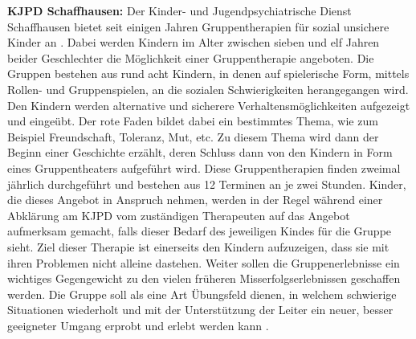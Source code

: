 \textbf{KJPD Schaffhausen:}
Der Kinder- und Jugendpsychiatrische Dienst Schaffhausen bietet seit einigen Jahren Gruppentherapien für sozial unsichere Kinder an \cite{KJPDW:2016}. Dabei werden Kindern im Alter zwischen sieben und elf Jahren beider Geschlechter die Möglichkeit einer Gruppentherapie angeboten. Die Gruppen bestehen aus rund acht Kindern, in denen auf spielerische Form, mittels Rollen- und Gruppenspielen, an die sozialen Schwierigkeiten herangegangen wird. Den Kindern werden alternative und sicherere Verhaltensmöglichkeiten aufgezeigt und eingeübt. Der rote Faden bildet dabei ein bestimmtes Thema, wie zum Beispiel Freundschaft, Toleranz, Mut, etc. Zu diesem Thema wird dann der Beginn einer Geschichte erzählt, deren Schluss dann von den Kindern in Form eines Gruppentheaters aufgeführt wird. Diese Gruppentherapien finden zweimal jährlich durchgeführt und bestehen aus 12 Terminen an je zwei Stunden. Kinder, die dieses Angebot in Anspruch nehmen, werden in der Regel während einer Abklärung am KJPD vom zuständigen Therapeuten auf das Angebot aufmerksam gemacht, falls dieser Bedarf des jeweiligen Kindes für die Gruppe sieht. Ziel dieser Therapie ist einerseits den Kindern aufzuzeigen, dass sie mit ihren Problemen nicht alleine dastehen. Weiter sollen die Gruppenerlebnisse ein wichtiges Gegengewicht zu den vielen früheren Misserfolgserlebnissen geschaffen werden. Die Gruppe soll als eine Art Übungsfeld dienen, in welchem schwierige Situationen wiederholt und mit der Unterstützung der Leiter ein neuer, besser geeigneter Umgang erprobt und erlebt werden kann \cite{KJPD:2016}. 

